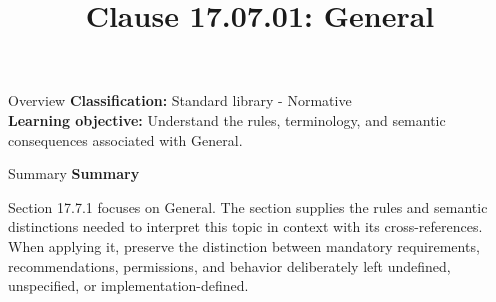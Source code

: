 \documentclass[10pt,letterpaper]{article}
\title{Clause 17.07.01: General}
\author{}
\date{}
\begin{document}
\maketitle
\begin{CornellOverviewBox}{Overview}
\textbf{Classification:} Standard library - Normative\\[2pt]
\textbf{Learning objective:} Understand the rules, terminology, and semantic consequences associated with General.
\end{CornellOverviewBox}\begin{CornellSummaryBox}{Summary}
{\sffamily\bfseries\color{Accent} Summary}\par\vspace{3pt}Section 17.7.1 focuses on General. The section supplies the rules and semantic distinctions needed to interpret this topic in context with its cross-references. When applying it, preserve the distinction between mandatory requirements, recommendations, permissions, and behavior deliberately left undefined, unspecified, or implementation-defined.
\end{CornellSummaryBox}
\end{document}
